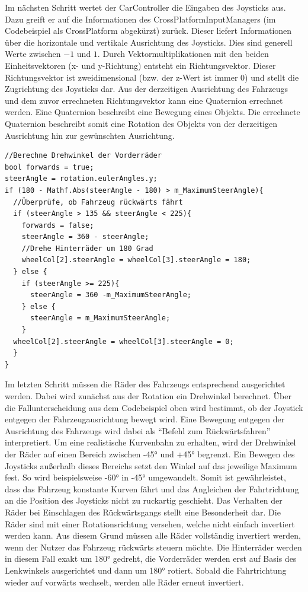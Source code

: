 	Im nächsten Schritt wertet der CarController die Eingaben des Joysticks aus. Dazu greift er auf die Informationen des CrossPlatformInputManagers (im Codebeispiel als CrossPlatform abgekürzt) zurück. Dieser liefert Informationen über die horizontale und vertikale Ausrichtung des Joysticks. Dies sind generell Werte zwischen $-1$ und $1$. Durch Vektormultiplikationen mit den beiden Einheitsvektoren (x- und y-Richtung) entsteht ein Richtungsvektor. Dieser Richtungsvektor ist zweidimensional (bzw. der z-Wert ist immer $0$) und stellt die Zugrichtung des Joysticks dar.
	Aus der derzeitigen Ausrichtung des Fahrzeugs und dem zuvor errechneten Richtungsvektor kann eine Quaternion errechnet werden. Eine Quaternion beschreibt eine Bewegung eines Objekts. Die errechnete Quaternion beschreibt somit eine Rotation des Objekts von der derzeitigen Ausrichtung hin zur gewünschten Ausrichtung.

	\begin{lstlisting}
//Berechne Drehwinkel der Vorderräder
bool forwards = true;
steerAngle = rotation.eulerAngles.y;
if (180 - Mathf.Abs(steerAngle - 180) > m_MaximumSteerAngle){
  //Überprüfe, ob Fahrzeug rückwärts fährt
  if (steerAngle > 135 && steerAngle < 225){
	forwards = false;
	steerAngle = 360 - steerAngle;
	//Drehe Hinterräder um 180 Grad
	wheelCol[2].steerAngle = wheelCol[3].steerAngle = 180;
  } else {
    if (steerAngle >= 225){
	  steerAngle = 360 -m_MaximumSteerAngle;
    } else {
  	  steerAngle = m_MaximumSteerAngle;
    }
  wheelCol[2].steerAngle = wheelCol[3].steerAngle = 0;
  }
}
	\end{lstlisting}

	Im letzten Schritt müssen die Räder des Fahrzeugs entsprechend ausgerichtet werden. Dabei wird zunächst aus der Rotation ein Drehwinkel berechnet. Über die Fallunterscheidung aus dem Codebeispiel oben wird bestimmt, ob der Joystick entgegen der Fahrzeugausrichtung bewegt wird. Eine Bewegung entgegen der Ausrichtung des Fahrzeugs wird dabei als \enquote{Befehl zum Rückwärtsfahren} interpretiert. Um eine realistische Kurvenbahn zu erhalten, wird der Drehwinkel der Räder auf einen Bereich zwischen -45° und +45° begrenzt. Ein Bewegen des Joysticks außerhalb dieses Bereichs setzt den Winkel auf das jeweilige Maximum fest. So wird beispielsweise -60° in -45° umgewandelt. Somit ist gewährleistet, dass das Fahrzeug konstante Kurven fährt und das Angleichen der Fahrtrichtung an die Position des Joysticks nicht zu ruckartig geschieht. Das Verhalten der Räder bei Einschlagen des Rückwärtsgangs stellt eine Besonderheit dar. Die Räder sind mit einer Rotationsrichtung versehen, welche nicht einfach invertiert werden kann. Aus diesem Grund müssen alle Räder vollständig invertiert werden, wenn der Nutzer das Fahrzeug rückwärts steuern möchte. Die Hinterräder werden in diesem Fall exakt um 180° gedreht, die Vorderräder werden erst auf Basis des Lenkwinkels ausgerichtet und dann um 180° rotiert. Sobald die Fahrtrichtung wieder auf vorwärts wechselt, werden alle Räder erneut invertiert.

